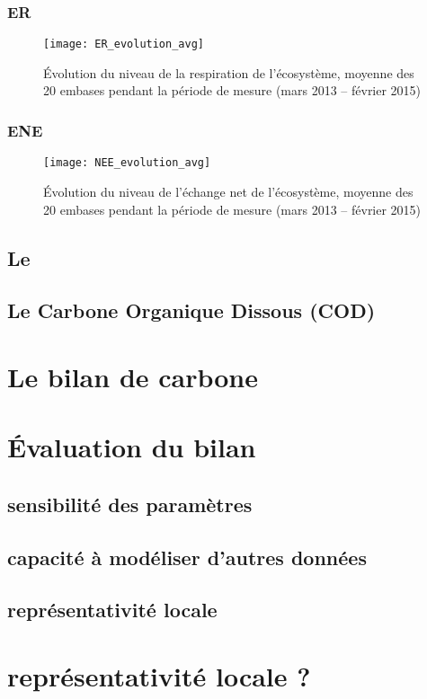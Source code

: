 \subsubsection{ER}

\begin{figure}
\centering
\texttt{[image: ER\_evolution\_avg]}
\caption{Évolution du niveau de la respiration de l'écosystème, moyenne des 20 embases pendant la période de mesure (mars 2013 -- février 2015)}
\label{fig:ER_evolution_avg}
\end{figure}

\subsubsection{ENE}

\begin{figure}
\centering
\texttt{[image: NEE\_evolution\_avg]}
\caption{Évolution du niveau de l'échange net de l'écosystème, moyenne des 20 embases pendant la période de mesure (mars 2013 -- février 2015)}
\label{fig:NEE_evolution_avg}
\end{figure}

\subsection{Le \chh}
\subsection{Le Carbone Organique Dissous (COD)}

\section{Le bilan de carbone}

\section{Évaluation du bilan}

\subsection{sensibilité des paramètres}

\subsection{capacité à modéliser d'autres données}

\subsection{représentativité locale}

\section{représentativité locale ?}